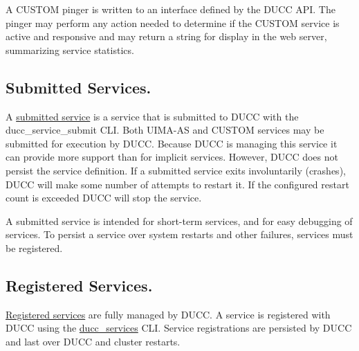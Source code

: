       A CUSTOM pinger is written to an interface defined by the DUCC API.  The pinger may perform
      any action needed to determine if the CUSTOM service is active and responsive and may return
      a string for display in the web server, summarizing service statistics.
      
      
      \subsection{Submitted Services.} A \hyperref[sec:cli.service-submit]{submitted service} is a
      service that is submitted to DUCC with the ducc\_service\_submit CLI.  Both UIMA-AS and
      CUSTOM services may be submitted for execution by DUCC. Because DUCC is managing this service
      it can provide more support than for implicit services.  However, DUCC does not persist the
      service definition. If a submitted service exits involuntarily (crashes), DUCC will make
      some number of attempts to restart it.  If the configured restart count is exceeded DUCC
      will stop the service.

      A submitted service is intended for short-term services, and for easy debugging of services.
      To persist a service over system restarts and other failures, services must be registered.
      
      \subsection{Registered Services.} \hyperref[sec:cli.ducc-services]{Registered services} are
      fully managed by DUCC. A service is registered with DUCC using the
      \hyperref[sec:cli.ducc-services]{ducc\_services} CLI. Service registrations are persisted by
      DUCC and last over DUCC and cluster restarts.

